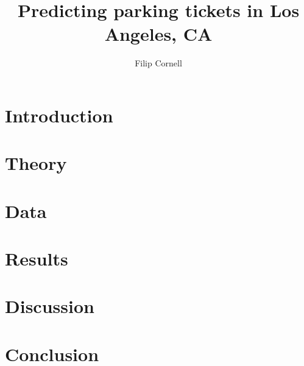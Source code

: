 \documentclass{article}
\begin{document}
\title{Predicting parking tickets in Los Angeles, CA}
\author{Filip Cornell}
\maketitle


\section{Introduction}


\section{Theory}

\section{Data}

\section{Results}

\section{Discussion}

\section{Conclusion}
\end{document}
